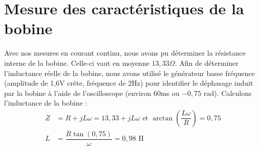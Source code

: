 \documentclass[12pt]{article}
\begin{document}
\section{Mesure des caractéristiques de la bobine}
Avec nos mesures en courant continu, nous avons pu déterminer la résistance interne de la bobine. Celle-ci vaut en moyenne $13,33\Omega$. Afin de déterminer l'inductance réelle de la bobine, nous avons utilisé le générateur basse fréquence (amplitude de 1,6V crête, fréquence de 2Hz) pour identifier le déphasage induit par la bobine à l'aide de l'oscilloscope (environ 60ms ou $-0,75 \text{ rad}$). Calculons l'inductance de la bobine :
\begin{align*}
    Z &= R + jL\omega = 13,33 + jL\omega \text{ et } \arctan\left(\dfrac{L\omega}{R}\right) = 0,75 \\
    L &= \dfrac{R\tan(0,75)}{\omega} = 0,98\text{ H}
\end{align*}
\end{document}
